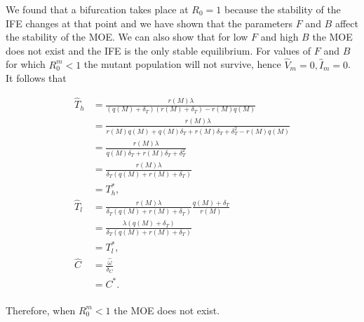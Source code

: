 \documentclass[11pt, oneside]{article}    %
\begin{document}
We found that a bifurcation takes place at $R_0 = 1$ because the stability of the IFE changes at that point and we have shown that the parameters $F$ and $B$ affect the stability of the MOE. We can also show that for low $F$ and high $B$ the MOE does not exist and the IFE is the only stable equilibrium.  For values of $F$ and $B$ for which $R_0^m < 1$ the mutant population will not survive, hence $\hat{V}_m = 0,\hat{I}_m = 0$. It follows that

\begin{align*}
\hat{T}_h &= \frac{r(M) \lambda}{(q(M) + \delta_T) (r(M) + \delta_T) - r(M)q(M) }\\
 & = \frac{r(M) \lambda}{r(M)q(M) + q(M) \delta_T + r(M) \delta_T + \delta_T^2 - r(M)q(M)} \\
 & = \frac{r(M) \lambda}{ q(M) \delta_T + r(M) \delta_T + \delta_T^2 } \\
& = \frac{r(M) \lambda}{ \delta_T (q(M)  + r(M) + \delta_T) } \\
& = T_h^*, \\
\hat{T}_l & = \frac{r(M) \lambda}{\delta_T (q(M)  + r(M) + \delta_T)}  \frac{q(M) + \delta_T}{r(M)} \\
& = \frac{\lambda (q(M) + \delta_T)}{ \delta_T (q(M)  + r(M) + \delta_T) }  \\
& = T_l^*, \\
\hat{C} &= \frac{\hat{\omega}}{\delta_C} \\
& = C^*. \\
\end{align*}

Therefore, when $R_0^m < 1$ the MOE does not exist.

\end{document}
